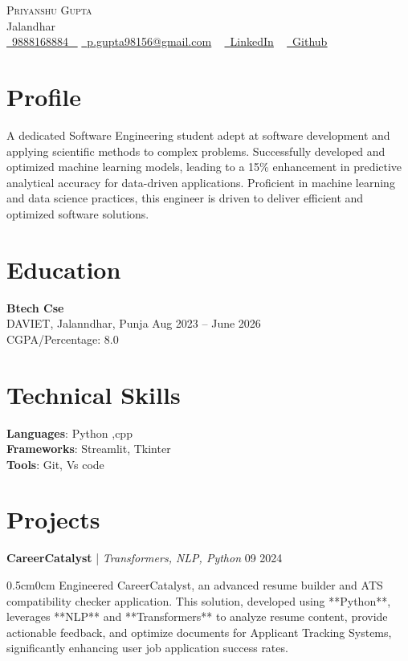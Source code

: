 \documentclass[letterpaper,11pt]{article}
\begin{document}
\begin{center}
    {\Huge \scshape Priyanshu Gupta} \\ \vspace{1pt}
    Jalandhar \\ \vspace{3pt}
    \small 
    \small \href{9888168884}{ \raisebox{-0.1\height}\faPhone\ \underline{9888168884} ~} 
    \href{p.gupta98156@gmail.com}{\raisebox{-0.2\height}\faEnvelope\  \underline{p.gupta98156@gmail.com}} ~
    \href{https://www.linkedin.com/in/priyanshu-gupta18/}{\raisebox{-0.2\height}\faLinkedinSquare\ \underline{LinkedIn}}  ~
    \href{https://github.com/Priyanshu98156}{\raisebox{-0.2\height}\faGithub\ \underline{Github}} ~
\end{center}

\section{Profile}
A dedicated Software Engineering student adept at software development and applying scientific methods to complex problems. Successfully developed and optimized machine learning models, leading to a 15\% enhancement in predictive analytical accuracy for data-driven applications. Proficient in machine learning and data science practices, this engineer is driven to deliver efficient and optimized software solutions.

\section*{Education}
\textbf{Btech Cse} \\[2pt]
DAVIET, Jalanndhar, Punja \hfill Aug 2023 -- June 2026 \\[2pt]
CGPA/Percentage: 8.0 \\[6pt]


\section*{Technical Skills}
\textbf{Languages}: Python ,cpp \\[4pt]
\textbf{Frameworks}: Streamlit, Tkinter \\[4pt]
\textbf{Tools}: Git, Vs code \\[4pt]


\section*{Projects}
\textbf{CareerCatalyst} \href{https://github.com/Priyanshu98156}{\faExternalLink} | \textit{Transformers, NLP, Python} \hfill 09 2024 \\[2pt]
\begin{adjustwidth}{0.5cm}{0cm}
Engineered CareerCatalyst, an advanced resume builder and ATS compatibility checker application. This solution, developed using **Python**, leverages **NLP** and **Transformers** to analyze resume content, provide actionable feedback, and optimize documents for Applicant Tracking Systems, significantly enhancing user job application success rates.
\end{adjustwidth}
\vspace{6pt}
\end{document}

